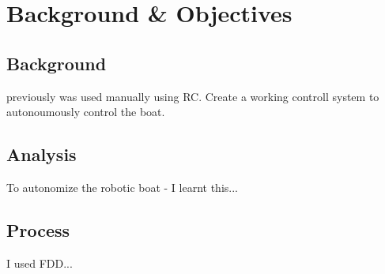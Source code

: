 

\section{Background \& Objectives}

\subsection{Background}
previously was used manually using RC. Create a working controll 
system to autonoumously control the boat. 


\subsection{Analysis}
To autonomize the robotic boat - I learnt this...

\subsection{Process}
I used FDD...